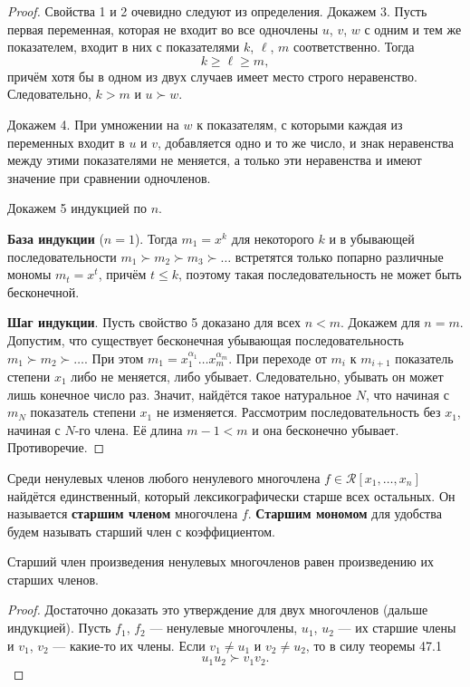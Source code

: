 \begin{proof}
    Свойства 1 и 2 очевидно следуют из определения. Докажем 3. Пусть первая переменная, которая не входит во все одночлены $u$, $v$, $w$ с одним и тем же показателем, входит в них с показателями $k$, $\ell$, $m$ соответственно. Тогда
    $$
    k \geqslant \ell \geqslant m,
    $$
    причём хотя бы в одном из двух случаев имеет место строго неравенство. Следовательно, $k > m$ и $u \succ w$.

    Докажем 4. При умножении на $w$ к показателям, с которыми каждая из переменных входит в $u$ и $v$, добавляется одно и то же число, и знак неравенства между этими показателями не меняется, а только эти неравенства и имеют значение при сравнении одночленов.

    Докажем 5 индукцией по $n$.

    \textbf{База индукции} ($n = 1$). Тогда $m_1 = x^k$ для некоторого $k$ и в убывающей последовательности $m_1 \succ m_2 \succ m_3 \succ \ldots$ встретятся только попарно различные мономы $m_t = x^t$, причём $t \leqslant k$, поэтому такая последовательность не может быть бесконечной.

    \textbf{Шаг индукции}. Пусть свойство 5 доказано для всех $n < m$. Докажем для $n = m$. Допустим, что существует бесконечная убывающая последовательность $m_1 \succ m_2 \succ \ldots$. При этом $m_1 = x_1^{\alpha_1}\ldots x_m^{\alpha_m}$. При переходе от $m_i$ к $m_{i + 1}$ показатель степени $x_1$ либо не меняется, либо убывает. Следовательно, убывать он может лишь конечное число раз. Значит, найдётся такое натуральное $N$, что начиная с $m_N$ показатель степени $x_1$ не изменяется. Рассмотрим последовательность без $x_1$, начиная с $N$-го члена. Её длина $m - 1 < m$ и она бесконечно убывает. Противоречие.
\end{proof}

\begin{definition}
    Среди ненулевых членов любого ненулевого многочлена $f \in \mathcal{R}[x_1, \ldots, x_n]$ найдётся единственный, который лексикографически старше всех остальных. Он называется \textbf{старшим членом} многочлена $f$. \textbf{Старшим мономом} для удобства будем называть старший член с коэффициентом.
\end{definition}

\begin{lemma}
    Старший член произведения ненулевых многочленов равен произведению их старших членов.
\end{lemma}

\begin{proof}
    Достаточно доказать это утверждение для двух многочленов (дальше индукцией). Пусть $f_1$, $f_2$ --- ненулевые многочлены, $u_1$, $u_2$ --- их старшие члены и $v_1$, $v_2$ --- какие-то их члены. Если $v_1 \ne u_1$ и $v_2 \ne u_2$, то в силу теоремы 47.1
    $$
    u_1u_2 \succ v_1v_2.
    $$
\end{proof}


